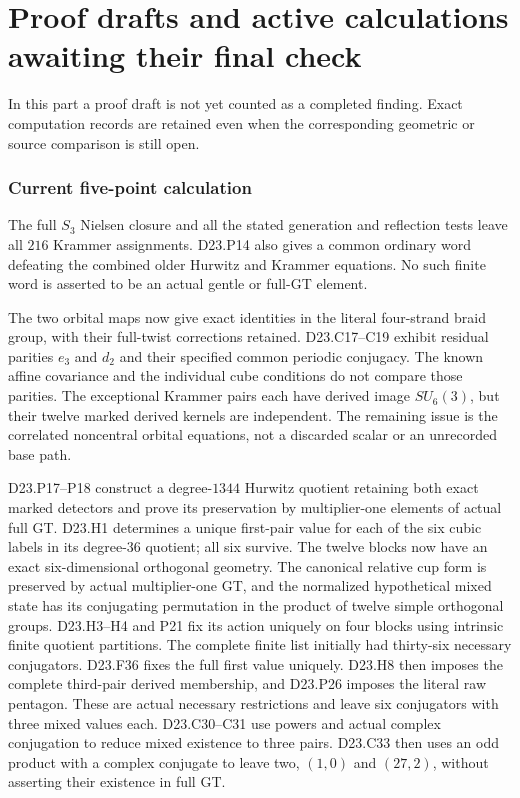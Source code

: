 \documentclass[11pt]{article}
\begin{document}


\part{Proof drafts and active calculations awaiting their final check}
In this part a proof draft is not yet counted as a completed
finding.  Exact computation records are retained even when the
corresponding geometric or source comparison is still open.

\section{Current five-point calculation}
The full $S_3$ Nielsen closure and all the stated generation and
reflection tests leave all $216$ Krammer assignments. D23.P14
also gives a common ordinary word defeating the combined older
Hurwitz and Krammer equations. No such finite word is asserted
to be an actual gentle or full-GT element.

The two orbital maps now give exact identities in the literal
four-strand braid group, with their full-twist corrections retained.
D23.C17--C19 exhibit residual parities $e_3$ and $d_2$ and their
specified common periodic conjugacy. The known affine covariance
and the individual cube conditions do not compare those parities.
The exceptional Krammer pairs each have derived image $SU_6(3)$,
but their twelve marked derived kernels are independent.
The remaining issue is the correlated noncentral orbital equations,
not a discarded scalar or an unrecorded base path.

D23.P17--P18 construct a degree-$1344$ Hurwitz quotient retaining
both exact marked detectors and prove its preservation by multiplier-one elements of actual
full GT. D23.H1 determines a unique first-pair value for each of
the six cubic labels in its degree-$36$ quotient; all six survive.
The twelve blocks now have an exact six-dimensional orthogonal
geometry. The canonical relative cup form is preserved by actual
multiplier-one GT, and the normalized hypothetical mixed state
has its conjugating permutation in the product of twelve simple
orthogonal groups. D23.H3--H4 and P21 fix its action uniquely on
four blocks using intrinsic finite quotient partitions. The
complete finite list initially had thirty-six necessary conjugators.
D23.F36 fixes the full first value uniquely. D23.H8 then imposes
the complete third-pair derived membership, and D23.P26 imposes
the literal raw pentagon. These are actual necessary restrictions
and leave six conjugators with three mixed values each.
D23.C30--C31 use powers and actual complex conjugation to reduce
mixed existence to three pairs. D23.C33 then uses an odd product
with a complex conjugate to leave two, $(1,0)$ and $(27,2)$,
without asserting their existence in full GT.
\end{document}
